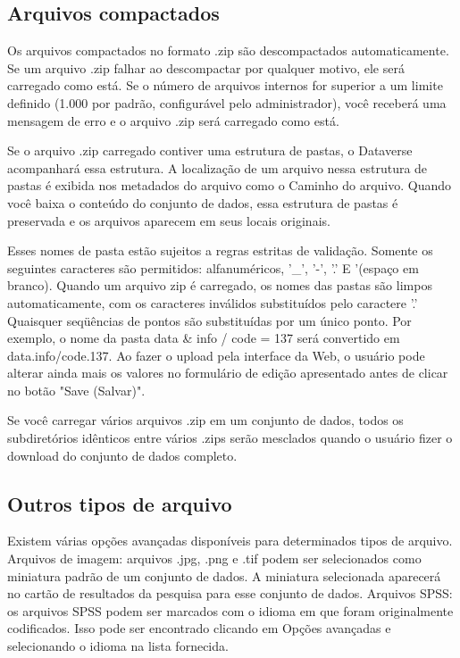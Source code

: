\documentclass[12pt,hidelinks]{article}
\begin{document}
    
    \subsection{Arquivos compactados}
    
\qquad Os arquivos compactados no formato .zip são descompactados automaticamente. Se um arquivo .zip falhar ao descompactar por qualquer motivo, ele será carregado como está. Se o número de arquivos internos for superior a um limite definido (1.000 por padrão, configurável pelo administrador), você receberá uma mensagem de erro e o arquivo .zip será carregado como está.

Se o arquivo .zip carregado contiver uma estrutura de pastas, o Dataverse acompanhará essa estrutura. A localização de um arquivo nessa estrutura de pastas é exibida nos metadados do arquivo como o Caminho do arquivo. Quando você baixa o conteúdo do conjunto de dados, essa estrutura de pastas é preservada e os arquivos aparecem em seus locais originais.

Esses nomes de pasta estão sujeitos a regras estritas de validação. Somente os seguintes caracteres são permitidos: alfanuméricos, '\_', '-', '.' E '(espaço em branco). Quando um arquivo zip é carregado, os nomes das pastas são limpos automaticamente, com os caracteres inválidos substituídos pelo caractere '.' Quaisquer seqüências de pontos são substituídas por um único ponto. Por exemplo, o nome da pasta data \& info / code = \@ 137 será convertido em data.info/code.137. Ao fazer o upload pela interface da Web, o usuário pode alterar ainda mais os valores no formulário de edição apresentado antes de clicar no botão "Save (Salvar)".

Se você carregar vários arquivos .zip em um conjunto de dados, todos os subdiretórios idênticos entre vários .zips serão mesclados quando o usuário fizer o download do conjunto de dados completo.
    
    \subsection{Outros tipos de arquivo}
    
\qquad Existem várias opções avançadas disponíveis para determinados tipos de arquivo. Arquivos de imagem: arquivos .jpg, .png e .tif podem ser selecionados como miniatura padrão de um conjunto de dados. A miniatura selecionada aparecerá no cartão de resultados da pesquisa para esse conjunto de dados.
Arquivos SPSS: os arquivos SPSS podem ser marcados com o idioma em que foram originalmente codificados. Isso pode ser encontrado clicando em Opções avançadas e selecionando o idioma na lista fornecida.    
    
\end{document}
